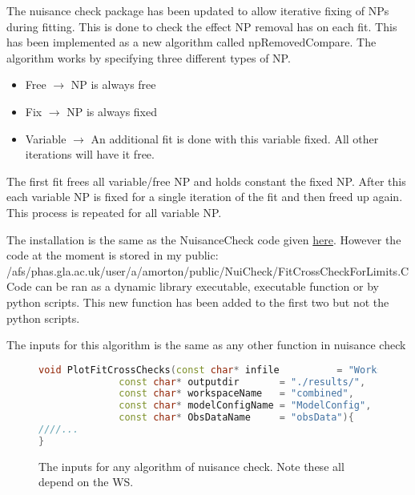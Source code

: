 \documentclass[idxtotoc,hyperref,openany]{labbook} %
\begin{document}

The nuisance check package has been updated to allow iterative fixing of NPs during fitting. This is done to check the effect NP removal has on each fit. This has been implemented as a new algorithm called npRemovedCompare.
\newline
The algorithm works by specifying three different types of NP. 
\begin{itemize}
\item Free $\rightarrow$  NP is always free 
\item Fix  $\rightarrow$ NP is always fixed 
\item Variable $\rightarrow$ An additional fit is done with this variable fixed. All other iterations will have it free.
\end{itemize}

The first fit frees all variable/free NP and holds constant the fixed NP. After this each variable NP is fixed for a single iteration of the fit and then freed up again. This process is repeated for all variable NP. 
\newline

The installation is the same as the NuisanceCheck code given \href{https://twiki.cern.ch/twiki/bin/viewauth/AtlasProtected/NuisanceCheck}{here}. However the code at the moment is stored in my public: \newline
/afs/phas.gla.ac.uk/user/a/amorton/public/NuiCheck/FitCrossCheckForLimits.C
\newline
Code can be ran as a dynamic library executable, executable function or by python scripts. This new function has been added to the first two but not the python scripts.
 

\newpage
{}
The inputs for this algorithm is the same as any other function in nuisance check
\begin{figure}[H]
 \begin{lstlisting}[language=C++]
void PlotFitCrossChecks(const char* infile          = "WorkspaceForTest1.root",
              const char* outputdir       = "./results/",
              const char* workspaceName   = "combined",
              const char* modelConfigName = "ModelConfig",
              const char* ObsDataName     = "obsData"){
////...
}
 \end{lstlisting}
 \caption{The inputs for any algorithm of nuisance check. Note these all depend on the WS.}
\end{figure}
\end{document}

